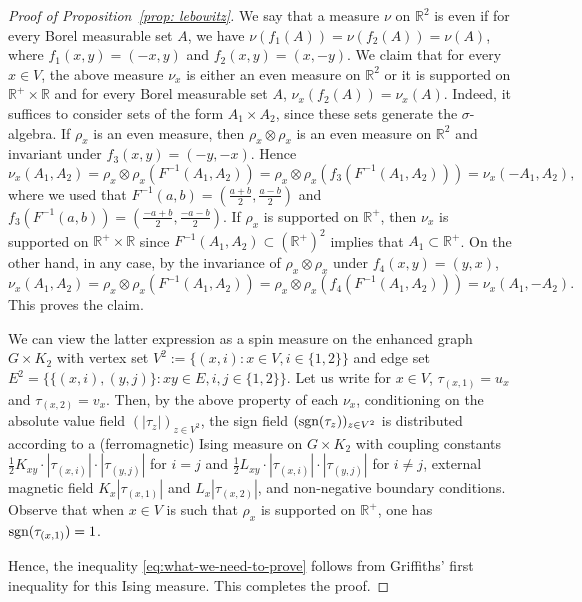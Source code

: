 \documentclass[11pt,a4paper]{article}
\numberwithin{equation}{section}
\theoremstyle{plain}
\theoremstyle{definition}
\begin{document}
\begin{proof}[Proof of Proposition~\textup{\ref{prop: lebowitz}}]
We say that a measure $\nu$ on $\mathbb{R}^2$ is even if for every Borel measurable set $A$, we have $\nu(f_1(A))=\nu(f_2(A))=\nu(A)$, where $f_1(x,y)=(-x,y)$ and $f_2(x,y)=(x,-y)$. We claim that for every $x\in V$, the above measure $\nu_x$ is either an even measure on $\mathbb{R}^2$ or it is supported on $\mathbb{R}^+\times \mathbb{R}$ and for every Borel measurable set $A$, $\nu_x(f_2(A))=\nu_x(A)$. Indeed, it suffices to consider sets of the form $A_1\times A_2$, since these sets generate the $\sigma$-algebra. If $\rho_x$ is an even measure, then $\rho_x\otimes \rho_x$ is an even measure on $\mathbb{R}^2$ and invariant under $f_3(x,y)=(-y,-x)$. Hence
\begin{equation}\nu_x(A_1,A_2)=\rho_x\otimes \rho_x(F^{-1}(A_1,A_2))=\rho_x\otimes \rho_x(f_3(F^{-1}(A_1,A_2)))=\nu_x(-A_1,A_2),
\end{equation}
where we used that $F^{-1}(a,b)=(\tfrac{a+b}{2},\tfrac{a-b}{2})$ and $f_3(F^{-1}(a,b))=(\tfrac{-a+b}{2},\tfrac{-a-b}{2})$.
If $\rho_x$ is supported on $\mathbb{R}^+$, then $\nu_x$ is supported on $\mathbb{R}^+\times \mathbb{R}$ since $F^{-1}(A_1,A_2)\subset (\mathbb{R}^+)^2$ implies that $A_1\subset \mathbb{R}^+$.
On the other hand, in any case, by the invariance of $\rho_x\otimes\rho_x$ under $f_4(x,y)=(y,x)$,
\begin{equation}
\nu_x(A_1,A_2)=\rho_x\otimes\rho_x(F^{-1}(A_1,A_2))=\rho_x\otimes\rho_x(f_4(F^{-1}(A_1,A_2)))=\nu_x(A_1,-A_2).
\end{equation}
This proves the claim.

We can view the latter expression as a spin measure on the enhanced graph $G\times K_2$ with vertex set $V^2:=\{(x,i): x\in V, i\in \{1,2\}\}$ and edge set $E^2=\{\{(x,i),(y,j)\}: xy\in E, i,j\in \{1,2\}\}$. Let us write for $x\in V$, $\tau_{(x,1)}=u_x$ and $\tau_{(x,2)}=v_x$. Then, by the above property of each $\nu_x$, conditioning on the absolute value field $(|\tau_z|)_{z\in V^2}$, the sign field $(\textup{sgn}(\tau_z))_{z\in V^2}$ is distributed according to a (ferromagnetic) Ising measure on $G\times K_2$ with coupling constants $\tfrac{1}{2} K_{xy}\cdot |\tau_{(x,i)}|\cdot |\tau_{(y,j)}|$ for $i=j$ and $\tfrac{1}{2}L_{xy}\cdot |\tau_{(x,i)}|\cdot |\tau_{(y,j)}|$ for $i\neq j$, external magnetic field $K_x|\tau_{(x,1)}|$ and $L_x|\tau_{(x,2)}|$, and non-negative boundary conditions. Observe that when $x\in V$ is such that $\rho_x$ is supported on $\mathbb R^+$, one has $\textup{sgn}(\tau_{(x,1)})=1$.

Hence, the inequality \eqref{eq:what-we-need-to-prove} follows from Griffiths' first inequality for this Ising measure. This completes the proof.
\end{proof}
\end{document}
